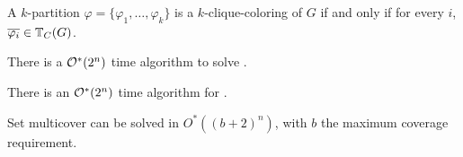 \begin{lemma}
    \label{lem:clique_transversal_colorings}
    A $k$-partition $\varphi = \{\varphi_1, \dots, \varphi_k\}$ is a $k$-clique-coloring of $G$ if and only if for every $i$, $\overline{\varphi_i} \in \mathbb{T}_{C}(G)$.
\end{lemma}


\begin{theorem}
    \label{thm:inc_exc}
    There is a $\mathcal{O}^*\!\left(2^n\right)$ time algorithm to solve .
\end{theorem}

\begin{theorem}
    \label{thm:clique_color_algorithm}
    There is an $\mathcal{O}^*\!\left(2^n\right)$ time algorithm for .
\end{theorem}



\begin{theorem}
    \label{thm:set_multicover}
    Set multicover can be solved in $O^*((b+2)^n)$, with $b$ the maximum coverage requirement.
\end{theorem}
